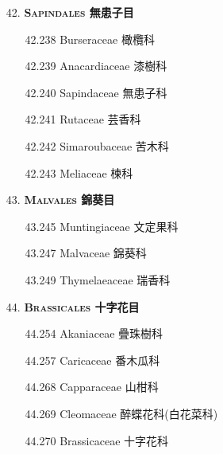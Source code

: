 \begin{enumerate}
\begin{enumerate}
        
    \end{enumerate}
  \item[42. ] \textbf{\textsc{Sapindales} 無患子目}   
    \begin{enumerate}
      \item[42.238] Burseraceae 橄欖科     
        
      \item[42.239] Anacardiaceae 漆樹科     
        
      \item[42.240] Sapindaceae 無患子科     
        
      \item[42.241] Rutaceae 芸香科     
        
      \item[42.242] Simaroubaceae 苦木科     
        
      \item[42.243] Meliaceae 楝科     
        
    \end{enumerate}
  \item[43. ] \textbf{\textsc{Malvales} 錦葵目}   
    \begin{enumerate}
      \item[43.245] Muntingiaceae 文定果科     
        
      \item[43.247] Malvaceae 錦葵科     
        
      \item[43.249] Thymelaeaceae 瑞香科     
        
    \end{enumerate}
  \item[44. ] \textbf{\textsc{Brassicales} 十字花目}   
    \begin{enumerate}
      \item[44.254] Akaniaceae 疊珠樹科     
        
      \item[44.257] Caricaceae 番木瓜科     
        
      \item[44.268] Capparaceae 山柑科     
        
      \item[44.269] Cleomaceae 醉蝶花科(白花菜科)     
        
      \item[44.270] Brassicaceae 十字花科     
        
    \end{enumerate}
\end{enumerate}
